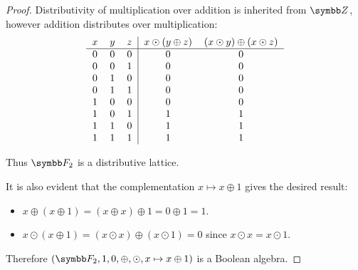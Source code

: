 \begin{proof}
  Distributivity of multiplication over addition is inherited from \( \Z \), however addition distributes over multiplication:
  \begin{equation*}
    \begin{tabular}{c c c | c c}
      \( x \)    & \( y \)    & \( z \)    & \(x \odot (y \oplus z) \) & \( (x \odot y) \oplus (x \odot z) \) \\
      \hline
      \( 0 \)    & \( 0 \)    & \( 0 \)    & \( 0 \)                   & \( 0 \) \\
      \( 0 \)    & \( 0 \)    & \( 1 \)    & \( 0 \)                   & \( 0 \) \\
      \( 0 \)    & \( 1 \)    & \( 0 \)    & \( 0 \)                   & \( 0 \) \\
      \( 0 \)    & \( 1 \)    & \( 1 \)    & \( 0 \)                   & \( 0 \) \\
      \( 1 \)    & \( 0 \)    & \( 0 \)    & \( 0 \)                   & \( 0 \) \\
      \( 1 \)    & \( 0 \)    & \( 1 \)    & \( 1 \)                   & \( 1 \) \\
      \( 1 \)    & \( 1 \)    & \( 0 \)    & \( 1 \)                   & \( 1 \) \\
      \( 1 \)    & \( 1 \)    & \( 1 \)    & \( 1 \)                   & \( 1 \)
    \end{tabular}
  \end{equation*}

  Thus \( \F_2 \) is a distributive lattice.

  It is also evident that the complementation \( x \mapsto x \oplus 1 \) gives the desired result:
  \begin{itemize}
    \item \( x \oplus (x \oplus 1) = (x \oplus x) \oplus 1 = 0 \oplus 1 = 1 \).
    \item \( x \odot (x \oplus 1) = (x \odot x) \oplus (x \odot 1) = 0 \) since \( x \odot x = x \odot 1 \).
  \end{itemize}

  Therefore \( (\F_2, 1, 0, \oplus, \odot, x \mapsto x \oplus 1) \) is a Boolean algebra.
\end{proof}
